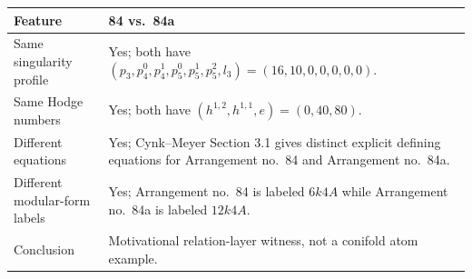 \begin{tabular}{@{}p{4.0cm}p{9.8cm}@{}}
\toprule
Feature & 84 vs.\ 84a \\
\midrule
Same singularity profile & Yes; both have $(p_3,p_{4}^{0},p_{4}^{1},p_{5}^{0},p_{5}^{1},p_{5}^{2},l_3)=(16,10,0,0,0,0,0)$. \\
Same Hodge numbers & Yes; both have $(h^{1,2},h^{1,1},e)=(0,40,80)$. \\
Different equations & Yes; Cynk--Meyer Section 3.1 gives distinct explicit defining equations for Arrangement no.\ 84 and Arrangement no.\ 84a. \\
Different modular-form labels & Yes; Arrangement no.\ 84 is labeled $6k4A$ while Arrangement no.\ 84a is labeled $12k4A$. \\
Conclusion & Motivational relation-layer witness, not a conifold atom example. \\
\bottomrule
\end{tabular}
